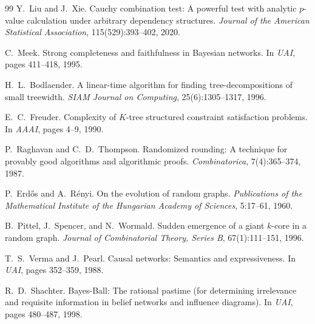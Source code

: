 \documentclass[11pt,a4paper]{article}
\theoremstyle{definition}
\theoremstyle{remark}
\begin{document}
\begin{thebibliography}{99}
Y.~Liu and J.~Xie.
\newblock Cauchy combination test: A powerful test with analytic $p$-value
  calculation under arbitrary dependency structures.
\newblock \emph{Journal of the American Statistical Association},
  115(529):393--402, 2020.

C.~Meek.
\newblock Strong completeness and faithfulness in {B}ayesian networks.
\newblock In \emph{UAI}, pages 411--418, 1995.

H.~L.~Bodlaender.
\newblock A linear-time algorithm for finding tree-decompositions of small
  treewidth.
\newblock \emph{SIAM Journal on Computing}, 25(6):1305--1317, 1996.

E.~C.~Freuder.
\newblock Complexity of $K$-tree structured constraint satisfaction problems.
\newblock In \emph{AAAI}, pages 4--9, 1990.

P.~Raghavan and C.~D.~Thompson.
\newblock Randomized rounding: A technique for provably good algorithms and
  algorithmic proofs.
\newblock \emph{Combinatorica}, 7(4):365--374, 1987.

P.~Erd\H{o}s and A.~R\'enyi.
\newblock On the evolution of random graphs.
\newblock \emph{Publications of the Mathematical Institute of the Hungarian
  Academy of Sciences}, 5:17--61, 1960.

B.~Pittel, J.~Spencer, and N.~Wormald.
\newblock Sudden emergence of a giant $k$-core in a random graph.
\newblock \emph{Journal of Combinatorial Theory, Series B}, 67(1):111--151,
  1996.

T.~S.~Verma and J.~Pearl.
\newblock Causal networks: Semantics and expressiveness.
\newblock In \emph{UAI}, pages 352--359, 1988.

R.~D.~Shachter.
\newblock Bayes-Ball: The rational pastime (for determining irrelevance and
  requisite information in belief networks and influence diagrams).
\newblock In \emph{UAI}, pages 480--487, 1998.

\end{thebibliography}
\end{document}
